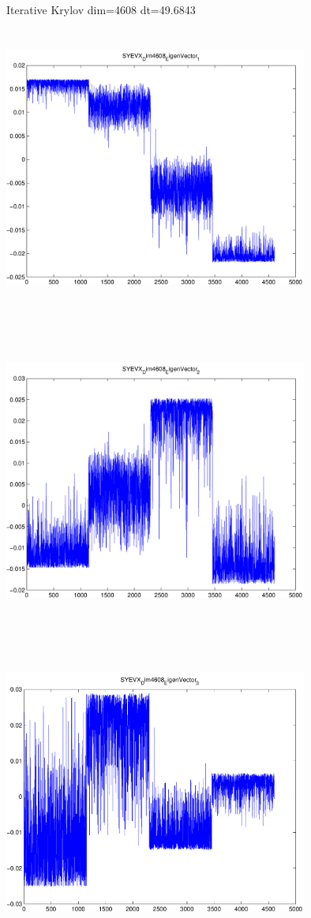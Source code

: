 \documentclass[9pt]{article}
\theoremstyle{plain}
\theoremstyle{definition}
\theoremstyle{remark}
\numberwithin{equation}{section}
\begin{document}
Iterative Krylov dim=4608 dt=49.6843
\includegraphics[width=10.0cm,height=10.0cm]{SYEVX_Dim4608_EigenVector_1.pdf}

\includegraphics[width=10.0cm,height=10.0cm]{SYEVX_Dim4608_EigenVector_2.pdf}

\includegraphics[width=10.0cm,height=10.0cm]{SYEVX_Dim4608_EigenVector_3.pdf}
\end{document}
